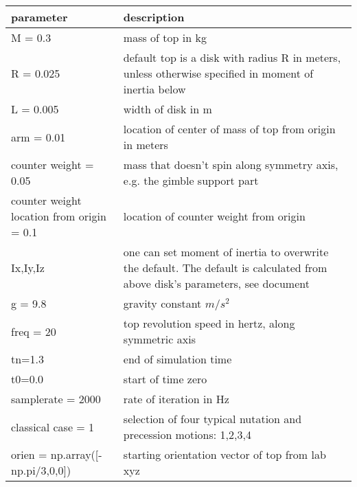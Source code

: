 \documentclass[12pt]{standalone}
\begin{document}
\footnotesize
\begin{tabular}{| p{} | p{} |}

   \hline
   parameter & description \\%
   \hline
    M = 0.3 & mass of top in kg \\
    R = 0.025&default top is a disk with radius R in meters, unless otherwise specified in moment of inertia below\\
    L = 0.005&width of disk in m\\
    arm = 0.01&location of center of mass of top from origin in meters\\
    counter weight = 0.05 & mass that doesn't spin along symmetry axis, e.g. the gimble support part\\
    counter weight location from origin = 0.1&location of counter weight from origin\\
    Ix,Iy,Iz & one can set moment of inertia to overwrite the default. The default is calculated from above disk's parameters, see document\\    
    g = 9.8&gravity constant $m/s^2$\\
    freq = 20&top revolution speed in hertz, along symmetric axis\\
    tn=1.3&end of simulation time\\
    t0=0.0&start of time zero\\
    samplerate = 2000&rate of iteration in Hz\\
    classical case = 1&selection of four typical nutation and precession motions: 1,2,3,4\\
    orien = np.array([-np.pi/3,0,0])&starting orientation vector of top from lab xyz\\
   \hline
   
\end{tabular}
\end{document}
